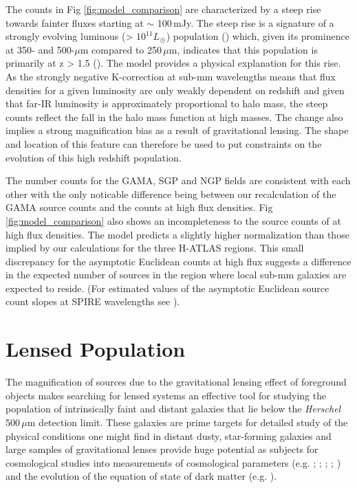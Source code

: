 \documentclass[fleqn,usenatbib]{mnras}
\begin{document}
The counts in Fig \ref{fig:model_comparison} are characterized by a steep rise towards fainter fluxes starting at $\sim$ 100\,mJy. The steep rise is a signature of a strongly evolving luminous (> $10^{11} L_{\astrosun}$) population (\citealt{Clements_2010}) which, given its prominence at 350- and 500-$\mu$m compared to 250\,$\mu$m, indicates that this population is primarily at z > 1.5 (\citealt{Granato_2004}). The \citealt{Cai_2013} model provides a physical explanation for this rise. As the strongly negative K-correction at sub-mm wavelengths means that flux densities for a given luminosity are only weakly dependent on redshift and given that far-IR luminosity is approximately proportional to halo mass, the steep counts reflect the fall in the halo mass function at high masses. The change also implies a strong magnification bias as a result of gravitational lensing. The shape and location of this feature can therefore be used to put constraints on the evolution of this high redshift population.

The number counts for the GAMA, SGP and NGP fields are consistent with each other with the only noticable difference being between our recalculation of the GAMA source counts and the \citealt{Valiante_2016} counts at high flux densities. Fig \ref{fig:model_comparison} also shows an incompleteness to the source counts of \citealt{Bethermin_2012} at high flux densities. The \citealt{Cai_2013} model predicts a slightly higher normalization than those implied by our calculations for the three H-ATLAS regions. This small discrepancy for the asymptotic Euclidean counts at high flux suggests a difference in the expected number of sources in the region where local sub-mm galaxies are expected to reside. (For estimated values of the asymptotic Euclidean source count slopes at SPIRE wavelengths see \citealt{Serjeant_2005}). 

\section{Lensed Population}
\label{sec:lensed_population}

The magnification of sources due to the gravitational lensing effect of foreground objects makes searching for lensed systems an effective tool for studying the population of intrinsically faint and distant galaxies that lie below the \textit{Herschel} 500\,$\mu$m detection limit. These galaxies are prime targets for detailed study of the physical conditions one might find in distant dusty, star-forming galaxies and large samples of gravitational lenses provide huge potential as subjects for cosmological studies into measurements of cosmological parameters (e.g. \citealt{Kochanek_1992}; \citealt{Kochanek_1996}; \citealt{Grillo_2008}; \citealt{Oguri_2012}; \citealt{Eales_2015}) and the evolution of the equation of state of dark matter (e.g. \citealt{Zhang_2009}). 
\end{document}
